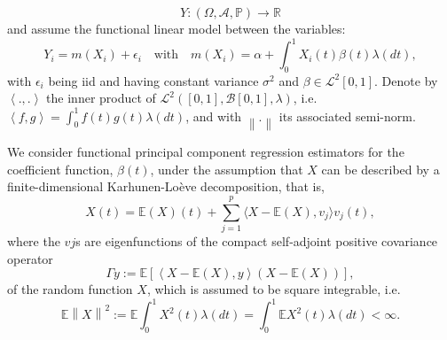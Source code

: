\documentclass[11pt]{article}
\begin{document}
$$Y: \left(\Omega, \mathcal{A}, \mathbb{P} \right) \to \mathbb{R}$$
and assume the functional linear model between the variables:
\begin{equation}
\label{eq:34}
Y_i = m\left(X_i\right) + \epsilon_i \quad \text{with} \quad m(X_i) = \alpha +  \int_{0}^{1} X_i(t)  \beta(t) \lambda \left( dt \right),
\end{equation}
with $\epsilon_i$ being iid and having constant variance $\sigma^2$ and $\beta \in \mathcal{L}^2[0,1]$. Denote by $\left \langle .,. \right\rangle$ the inner product of $\mathcal{L}^2\left([0,1], \mathcal{B}[0,1],  \lambda \right)$, i.e. $\left\langle f,g \right\rangle = \int_{0}^{1} f\left(t \right) g \left( t \right) \lambda(dt)$, and with $\left\|. \right\|$ its associated semi-norm. 

We consider functional principal component regression estimators for the coefficient function, $\beta(t)$, under the assumption that $X$ can be described by a finite-dimensional Karhunen-Loève decomposition,
that is,
\begin{equation}
\label{eq:22}
X(t) = \mathbb{E}(X)(t)+  \sum_{j=1}^p \langle X -\mathbb{E}(X), v_j \rangle v_j(t),
\end{equation}
where the $vj$s are eigenfunctions of the compact self-adjoint positive covariance operator 
\begin{equation}
\Gamma y := \mathbb{E} \left[ \left \langle X - \mathbb{E}(X), y  \right \rangle \left( X - \mathbb{E}(X) \right) \right],  
\end{equation}
of the random function $X$, which is assumed to be square integrable, i.e.
\begin{equation*}
\mathbb{E} \left\| 	X \right\|^2 := \mathbb{E} \int_{0}^{1} X^2 (t) \lambda(dt) = \int_{0}^{1} \mathbb{E} X^2(t) \lambda(dt) < \infty.
\end{equation*}
\end{document}
